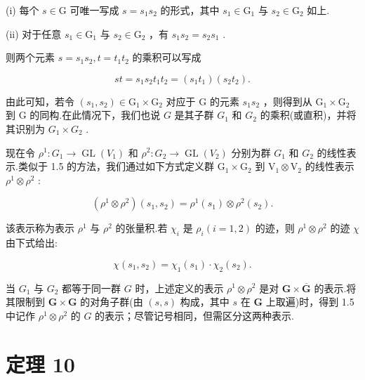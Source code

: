 \documentclass[10pt]{article}
\begin{document}
(i) 每个 \(s \in  \mathrm{G}\) 可唯一写成 \(s = {s}_{1}{s}_{2}\) 的形式，其中 \({s}_{1} \in  {\mathrm{G}}_{1}\) 与 \({s}_{2} \in  {\mathrm{G}}_{2}\) 如上.

(ii) 对于任意 \({s}_{1} \in  {\mathrm{G}}_{1}\) 与 \({s}_{2} \in  {\mathrm{G}}_{2}\) ，有 \({s}_{1}{s}_{2} = {s}_{2}{s}_{1}\) .

则两个元素 \(s = {s}_{1}{s}_{2},t = {t}_{1}{t}_{2}\) 的乘积可以写成

\[
{st} = {s}_{1}{s}_{2}{t}_{1}{t}_{2} = \left( {{s}_{1}{t}_{1}}\right) \left( {{s}_{2}{t}_{2}}\right) .
\]

由此可知，若令 \(\left( {{s}_{1},{s}_{2}}\right)  \in  {\mathrm{G}}_{1} \times  {\mathrm{G}}_{2}\) 对应于 \(\mathrm{G}\) 的元素 \({s}_{1}{s}_{2}\) ，则得到从 \({\mathrm{G}}_{1} \times  {\mathrm{G}}_{2}\) 到 \(\mathrm{G}\) 的同构.在此情况下，我们也说 \(G\) 是其子群 \({G}_{1}\) 和 \({G}_{2}\) 的乘积(或直积)，并将其识别为 \({G}_{1} \times  {G}_{2}\) .

现在令 \({\rho }^{1} : {G}_{1} \rightarrow  \operatorname{GL}\left( {V}_{1}\right)\) 和 \({\rho }^{2} : {G}_{2} \rightarrow  \operatorname{GL}\left( {V}_{2}\right)\) 分别为群 \({G}_{1}\) 和 \({G}_{2}\) 的线性表示.类似于 1.5 的方法，我们通过如下方式定义群 \({\mathrm{G}}_{1} \times  {\mathrm{G}}_{2}\) 到 \({\mathrm{V}}_{1} \otimes  {\mathrm{V}}_{2}\) 的线性表示 \({\rho }^{1} \otimes  {\rho }^{2}\) :

\[
\left( {{\rho }^{1} \otimes  {\rho }^{2}}\right) \left( {{s}_{1},{s}_{2}}\right)  = {\rho }^{1}\left( {s}_{1}\right)  \otimes  {\rho }^{2}\left( {s}_{2}\right) .
\]

该表示称为表示 \({\rho }^{1}\) 与 \({\rho }^{2}\) 的张量积.若 \({\chi }_{i}\) 是 \({\rho }_{i}\left( {i = 1,2}\right)\) 的迹，则 \({\rho }^{1} \otimes  {\rho }^{2}\) 的迹 \(\chi\) 由下式给出:

\[
\chi \left( {{s}_{1},{s}_{2}}\right)  = {\chi }_{1}\left( {s}_{1}\right)  \cdot  {\chi }_{2}\left( {s}_{2}\right) .
\]

当 \({G}_{1}\) 与 \({G}_{2}\) 都等于同一群 \(G\) 时，上述定义的表示 \({\rho }^{1} \otimes  {\rho }^{2}\) 是对 \(\mathbf{G} \times  \overline{\mathbf{G}}\) 的表示.将其限制到 \(\mathbf{G} \times  \mathbf{G}\) 的对角子群(由 \(\left( {s,s}\right)\) 构成，其中 \(s\) 在 \(\mathbf{G}\) 上取遍)时，得到 1.5 中记作 \({\rho }^{1} \otimes  {\rho }^{2}\) 的 \(G\) 的表示；尽管记号相同，但需区分这两种表示.

\section*{定理 10}
\end{document}
